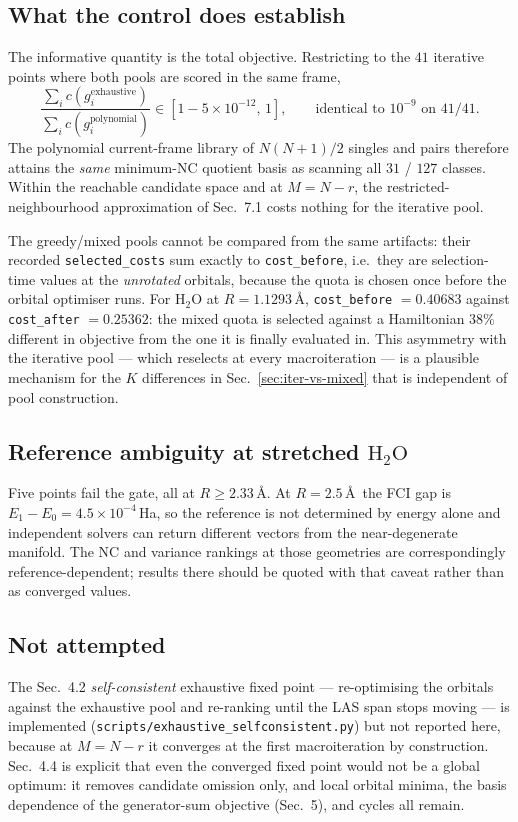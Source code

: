 \subsection{What the control does establish}
The informative quantity is the total objective. Restricting to the $41$
iterative points where both pools are scored in the same frame,
\begin{equation}
\frac{\sum_i c(g_i^{\mathrm{exhaustive}})}
     {\sum_i c(g_i^{\mathrm{polynomial}})}
\in [1 - 5\times10^{-12},\, 1],
\qquad \text{identical to } 10^{-9} \text{ on } 41/41 .
\end{equation}
The polynomial current-frame library of $N(N+1)/2$ singles and pairs therefore
attains the \emph{same} minimum-NC quotient basis as scanning all $31$ / $127$
classes. Within the reachable candidate space and at $M = N-r$, the
restricted-neighbourhood approximation of Sec.~7.1 costs nothing for the
iterative pool.

The greedy/mixed pools cannot be compared from the same artifacts: their
recorded \texttt{selected\_costs} sum exactly to \texttt{cost\_before}, i.e.\
they are selection-time values at the \emph{unrotated} orbitals, because the
quota is chosen once before the orbital optimiser runs. For
$\mathrm{H_2O}$ at $R=1.1293$\,\AA, \texttt{cost\_before} $= 0.40683$ against
\texttt{cost\_after} $= 0.25362$: the mixed quota is selected against a
Hamiltonian $38\%$ different in objective from the one it is finally evaluated
in. This asymmetry with the iterative pool --- which reselects at every
macroiteration --- is a plausible mechanism for the $K$ differences in
Sec.~\ref{sec:iter-vs-mixed} that is independent of pool construction.

\subsection{Reference ambiguity at stretched $\mathrm{H_2O}$}
Five points fail the gate, all at $R \ge 2.33$\,\AA. At $R = 2.5$\,\AA\ the FCI
gap is $E_1 - E_0 = 4.5\times10^{-4}$\,Ha, so the reference is not determined by
energy alone and independent solvers can return different vectors from the
near-degenerate manifold. The NC and variance rankings at those geometries are
correspondingly reference-dependent; results there should be quoted with that
caveat rather than as converged values.

\subsection{Not attempted}
The Sec.~4.2 \emph{self-consistent} exhaustive fixed point --- re-optimising the
orbitals against the exhaustive pool and re-ranking until the LAS span stops
moving --- is implemented
(\texttt{scripts/exhaustive\_selfconsistent.py}) but not reported here, because
at $M = N-r$ it converges at the first macroiteration by construction. Sec.~4.4
is explicit that even the converged fixed point would not be a global optimum:
it removes candidate omission only, and local orbital minima, the basis
dependence of the generator-sum objective (Sec.~5), and cycles all remain.

